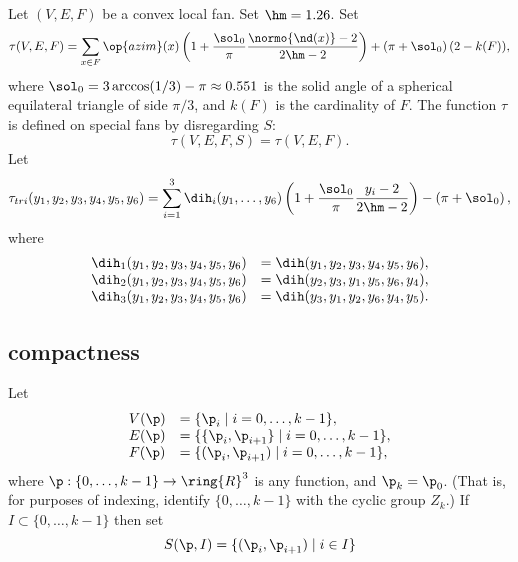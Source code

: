 \begin{definition}\label{def:tau}
Let $(V,E,F)$ be a convex local fan.  Set $\hm = 1.26$.  Set
\begin{displaymath}
  \tau(V,E,F) =\sum_{x\in F} \op{azim}(x)\left(1 + \dfrac{\sol_0}{\pi}  
    \dfrac{\normo{\nd(x)}-2}{2\hm-2}\right) 
+ \left(\pi+{\sol_0}\right) (2- k(F)),
\end{displaymath}
where $\sol_0=3\arccos(1/3)-\pi\approx0.551$ is the solid angle of a
spherical equilateral triangle of side $\pi/3$, and $k(F)$ is the
cardinality of $F$.  The function $\tau$ is defined on special fans by
disregarding $S$:
\begin{displaymath}
\tau(V,E,F,S) = \tau(V,E,F).
\end{displaymath}
Let 
\begin{displaymath}
  \tau_{tri}(y_1,y_2,y_3,y_4,y_5,y_6) =
  \sum_{i=1}^3 \dih_i(y_1,\ldots,y_6)
\left(1 + \dfrac{\sol_0}{\pi}  \dfrac{y_i -2}{2\hm-2}\right) 
- \left(\pi+{\sol_0}\right),
\end{displaymath}
where
\begin{displaymath}
\begin{array}{lll}
\dih_1(y_1,y_2,y_3,y_4,y_5,y_6) &= \dih(y_1,y_2,y_3,y_4,y_5,y_6),\\
\dih_2(y_1,y_2,y_3,y_4,y_5,y_6) &= \dih(y_2,y_3,y_1,y_5,y_6,y_4),\\
\dih_3(y_1,y_2,y_3,y_4,y_5,y_6) &= \dih(y_3,y_1,y_2,y_6,y_4,y_5).\\
\end{array}
\end{displaymath}
\end{definition}



\subsection{compactness}

Let 
\begin{displaymath}
\begin{array}{lll}
V(\p) &= \{\p_{i}\mid i=0,\ldots,k-1\},\\
E(\p) &= \{\{\p_{i},\p_{i+1}\}\mid i=0,\ldots,k-1\},\\
F(\p) &= \{(\p_{i},\p_{i+1}) \mid i=0,\ldots,k-1\},\\
\end{array}
\end{displaymath}
where $\p:\{0,\ldots,k-1\}\to \ring{R}^3$ is any function, and $\p_k =
\p_0$.  (That is, for purposes of indexing, identify
$\{0,\ldots,k-1\}$ with the cyclic group $Z_k$.)  If
$I\subset\{0,\ldots,k-1\}$ then set
\begin{displaymath}S(\p,I) = \{(\p_i ,\p_{i+1}) \mid i\in
I\}\end{displaymath}

